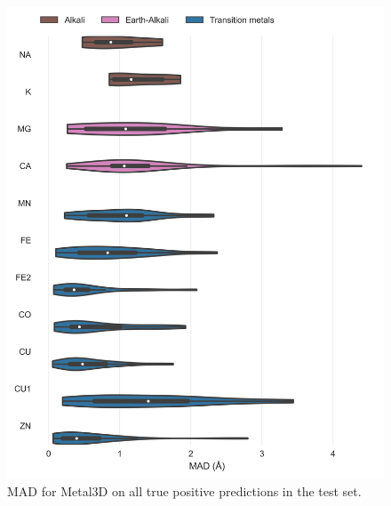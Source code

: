 \documentclass[  ASAPversion,
  ,
  9pt]{elife}
\newenvironment{fignos:tagged-figure}[1][]{
  \let\oldthefigure\thefigure
  \let\oldtheHfigure\theHfigure
  \renewcommand{\thefigure}{#1}
  \renewcommand{\theHfigure}{#1}
}{
  \let\thefigure\oldthefigure
  \let\theHfigure\oldtheHfigure
  \addtocounter{figure}{-1}
}
\begin{document}
\begin{fignos:tagged-figure}[S5]

\begin{figure}
\hypertarget{fig:selectivity-distance-metal3d}{%
\centering
\includegraphics{images/model_0.5metal3D_distances_violin_0.5.jpg}
\caption{MAD for Metal3D on all true positive predictions in the test set.}\label{fig:selectivity-distance-metal3d}
}
\end{figure}

\end{fignos:tagged-figure}
\end{document}
